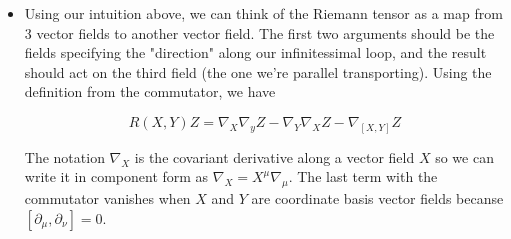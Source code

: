 \documentclass[11pt]{article}
\begin{document}
\begin{itemize}
    \item Using our intuition above, we can think of the Riemann tensor as a map from 3 vector fields to another vector field. The first two arguments should be the fields specifying the "direction" along our infinitessimal loop,
    and the result should act on the third field (the one we're parallel transporting). Using the definition from the commutator, we have  
    
    \[ 
        \boxed{R(X,Y)Z = \nabla_{X}\nabla_{y}Z - \nabla_{Y}\nabla_{X}Z - \nabla_{[X,Y]}Z}
    \]
    
    The notation \( \nabla_{X} \) is the covariant derivative along a vector field \( X \) so we can write it in component form as \( \nabla_{X} = X^{\mu}\nabla_{\mu} \). The last term with the commutator vanishes when \( X \) and \( Y \)
    are coordinate basis vector fields becanse \( [\partial_{\mu}, \partial_{\nu}] = 0 \).
    
\end{itemize}
\end{document}
